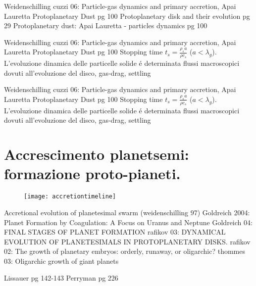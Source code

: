 \begin{workout}
Weidenschilling cuzzi 06: Particle-gas dynamics and primary accretion, Apai Lauretta Protoplanetary Dust pg 100
Protoplanetary disk and their evolution pg 29
Protoplanetary dust: Apai Lauretta - particles dynamics pg 100
\end{workout}

\begin{workout}
Weidenschilling cuzzi 06: Particle-gas dynamics and primary accretion, Apai Lauretta Protoplanetary Dust pg 100
Stopping time $t_s=\frac{\rho_sa}{\rho c_s}$ ($a<\lambda_g$). L'evoluzione dinamica delle particelle solide \'e determinata flussi macroscopici dovuti all'evoluzione del disco, gas-drag, settling
\end{workout}

\begin{workout}
Weidenschilling cuzzi 06: Particle-gas dynamics and primary accretion, Apai Lauretta Protoplanetary Dust pg 100
Stopping time $t_s=\frac{\rho_sa}{\rho c_s}$ ($a<\lambda_g$). L'evoluzione dinamica delle particelle solide \'e determinata flussi macroscopici dovuti all'evoluzione del disco, gas-drag, settling
\end{workout}

\section{Accrescimento planetsemi: formazione proto-pianeti.}


\begin{figure}[!t]
\texttt{[image: accretiontimeline]}
\end{figure}

\begin{workout}
Accretional evolution of planetesimal swarm (weidenschilling 97)
Goldreich 2004: Planet Formation by Coagulation: A Focus on Uranus and Neptune
Goldreich 04: FINAL STAGES OF PLANET FORMATION
rafikov 03: DYNAMICAL EVOLUTION OF PLANETESIMALS IN PROTOPLANETARY DISKS.
rafikov 02: The growth of planetary embryos: orderly, runaway, or oligarchic?
thommes 03: Oligarchic growth of giant planets
\end{workout}

\begin{workout}[10m-10km, 100km-1000km, 1000km-10000km: refs]
Lissauer pg 142-143
Perryman pg 226
\end{workout}

